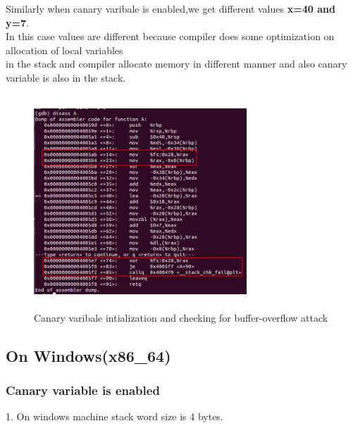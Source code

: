 \documentclass{article}
\begin{document}
          Similarly when canary varibale is enabled,we get different values \textbf{x=40 and y=7}.\\
          In this case values are different because compiler does some optimization on allocation of local variables\\
           in the stack and compiler allocate memory in different manner and also canary variable is also in the stack.\\
           
           \begin{figure}[H]
             \begin{center}
		\includegraphics[width=8cm,height=8cm]{can.png}
	\caption{Canary varibale intialization and checking for buffer-overflow attack}
	\end{center}
	\end{figure}
         
 \subsection{On Windows(x86\_64)}
  \subsubsection{Canary variable is enabled}
  
  1. On windows machine stack word size is 4 bytes.
      
\end{document}

